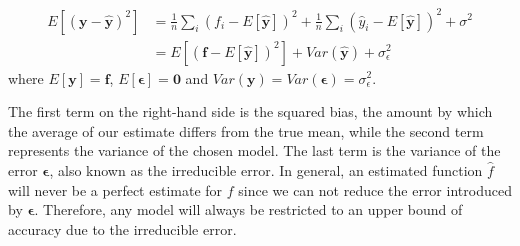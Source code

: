 \begin{align*}
E\left[\left(\boldsymbol{y}-\boldsymbol{\hat{y}}\right)^2\right] &= \frac{1}{n}\sum_i\left(f_i- E\left[\boldsymbol{\hat{y}}\right]\right)^2+\frac{1}{n}\sum_i\left(\hat{y}_i- E\left[\boldsymbol{\hat{y}}\right]\right)^2+\sigma^2 \\
&= E\left[\left(\boldsymbol{f}-E\left[\boldsymbol{\hat{y}}\right]\right)^2\right] + Var\left(\boldsymbol{\hat{y}}\right) + \sigma_{\epsilon}^2
\end{align*}
where $E[\boldsymbol{y}] = \boldsymbol{f}$, $E\left[\boldsymbol{\epsilon}\right] = \boldsymbol{0}$ and $Var\left(\boldsymbol{y}\right) = Var \left(\boldsymbol{\epsilon}\right) = \sigma_{\epsilon}^2$.

\begin{comment}
and since the variance of $\boldsymbol{y}$ and $\boldsymbol{\epsilon}$ are both equal to $\sigma^2$, we can use the relations $E[\boldsymbol{y}] = \boldsymbol{f}$, $ E[\boldsymbol{\epsilon}] = 0 $ and $Var(\boldsymbol{y}) = Var(\boldsymbol{\epsilon}) = \sigma_{\epsilon}^2$. The mean value of $\boldsymbol{\epsilon}$ is by definition equal to zero. In addition, the function $\boldsymbol{f}$ is not a stochastic variable, and the same argument can also be used for $\boldsymbol{\hat{y}}$. This allows us to insert the expression $\boldsymbol{y}$ into the cost function
\begin{align*}
E[(\boldsymbol{y-\hat{y}})^2] &= E[(\boldsymbol{f + \epsilon - \hat{y}})^2].
\end{align*}
By using the infamous trick of both adding and subtracting simultaneously, we arrive at
\begin{align*}
E\left[(\boldsymbol{y}-\boldsymbol{\hat{y}})^2\right] &= E[(\boldsymbol{f + \epsilon - \hat{y}} + E[\boldsymbol{y}] - E[\boldsymbol{y}])^2 ].
\end{align*}

And simply by using the relations mentioned above concerning the expectation value for $\boldsymbol{y}$ and the variances for both $\boldsymbol{y}$ and $\epsilon$, the cost function can be rewritten to:

\begin{align*}
E\left[(\boldsymbol{y}-\boldsymbol{\hat{y}})^2\right] &=  E[(\boldsymbol{f}-E[\boldsymbol{\hat{y}}])^2] + Var(\boldsymbol{\hat{y}}) + \sigma_{\epsilon}^2 \\
 &= \frac{1}{n}\sum_i(f_i- E\left[\boldsymbol{\hat{y}}\right])^2+\frac{1}{n}\sum_i(\hat{y}_i- E\left[\boldsymbol{\hat{y}}\right])^2+\sigma^2_{\epsilon}.
\end{align*}

\end{comment}
The first term on the right-hand side is the squared bias, the amount by which the average of our estimate differs from the true mean, while the second term represents the variance of the chosen model. The last term is the variance of the error $\boldsymbol{\epsilon}$, also known as the irreducible error. In general, an estimated function $\hat{f}$ will never be a perfect estimate for $f$ since we can not reduce the error introduced by $\boldsymbol{\epsilon}$. Therefore, any model will always be restricted to an upper bound of accuracy due to the irreducible error.


